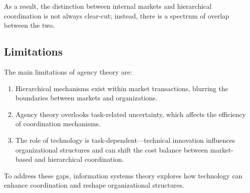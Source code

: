 As a result, the distinction between internal markets and hierarchical coordination is not always clear-cut; instead, there is a spectrum of overlap between the two.

\subsection{Limitations}
The main limitations of agency theory are: 
\begin{enumerate}
    \item Hierarchical mechanisms exist within market transactions, blurring the boundaries between markets and organizations.
    \item Agency theory overlooks task-related uncertainty, which affects the efficiency of coordination mechanisms.
    \item The role of technology is task-dependent—technical innovation influences organizational structures and can shift the cost balance between market-based and hierarchical coordination.
\end{enumerate}
\noindent To address these gaps, information systems theory explores how technology can enhance coordination and reshape organizational structures.